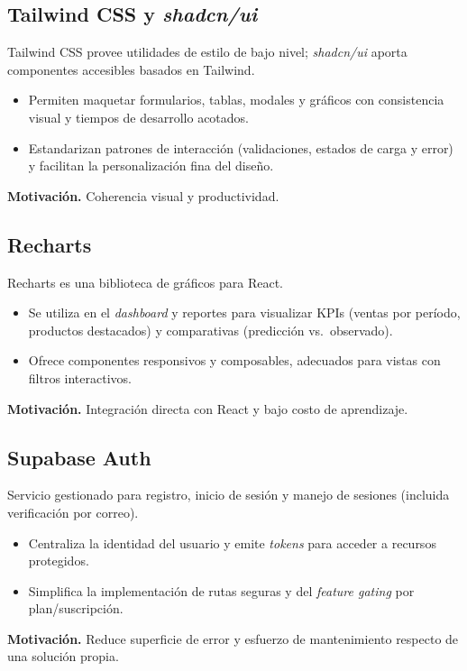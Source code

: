 \subsection{Tailwind CSS y \textit{shadcn/ui}}
Tailwind CSS provee utilidades de estilo de bajo nivel; \textit{shadcn/ui} aporta componentes accesibles basados en Tailwind.
\begin{itemize}
    \item Permiten maquetar formularios, tablas, modales y gráficos con consistencia visual y tiempos de desarrollo acotados.
    \item Estandarizan patrones de interacción (validaciones, estados de carga y error) y facilitan la personalización fina del diseño.
\end{itemize}
\noindent\textbf{Motivación.} Coherencia visual y productividad. 

\subsection{Recharts}
Recharts es una biblioteca de gráficos para React.
\begin{itemize}
    \item Se utiliza en el \textit{dashboard} y reportes para visualizar KPIs (ventas por período, productos destacados) y comparativas (predicción vs.\ observado).
    \item Ofrece componentes responsivos y composables, adecuados para vistas con filtros interactivos.
\end{itemize}
\noindent\textbf{Motivación.} Integración directa con React y bajo costo de aprendizaje.

\subsection{Supabase Auth}
Servicio gestionado para registro, inicio de sesión y manejo de sesiones (incluida verificación por correo).
\begin{itemize}
    \item Centraliza la identidad del usuario y emite \textit{tokens} para acceder a recursos protegidos.
    \item Simplifica la implementación de rutas seguras y del \textit{feature gating} por plan/suscripción.
\end{itemize}
\noindent\textbf{Motivación.} Reduce superficie de error y esfuerzo de mantenimiento respecto de una solución propia.

